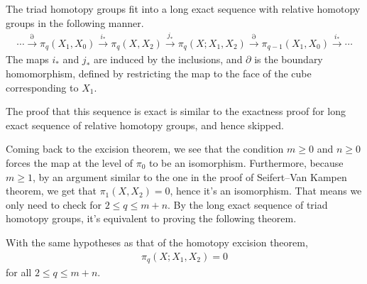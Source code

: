 \begin{lem}
  The triad homotopy groups fit into a long exact sequence with relative homotopy groups in the
  following manner.
  \begin{align*}
    \cdots \xrightarrow{\partial} \pi_q(X_1, X_0) \xrightarrow{i_{\ast}} \pi_q(X, X_2)
    \xrightarrow{j_{\ast}} \pi_q(X; X_1, X_2) \xrightarrow{\partial} \pi_{q-1}(X_1, X_0) \xrightarrow{i_{\ast}} \cdots
  \end{align*}
  The maps $i_{\ast}$ and $j_{\ast}$ are induced by the inclusions, and $\partial$ is the boundary
  homomorphism, defined by restricting the map to the face of the cube corresponding to $X_1$.
\end{lem}
The proof that this sequence is exact is similar to the exactness proof for long exact sequence of
relative homotopy groups, and hence skipped.

Coming back to the excision theorem, we see that the condition $m \geq 0$ and $n \geq 0$ forces the
map at the level of $\pi_0$ to be an isomorphism. Furthermore, because $m \geq 1$, by an argument
similar to the one in the proof of Seifert--Van Kampen theorem, we get that $\pi_1(X, X_2) = 0$,
hence it's an isomorphism.  That means we only need to check for $2 \leq q \leq m+n$. By the long
exact sequence of triad homotopy groups, it's equivalent to proving the following theorem.
\begin{thm}
  With the same hypotheses as that of the homotopy excision theorem,
  \begin{align*}
    \pi_q(X; X_1, X_2) = 0
  \end{align*}
  for all $2 \leq q \leq m+n$.
\end{thm}

